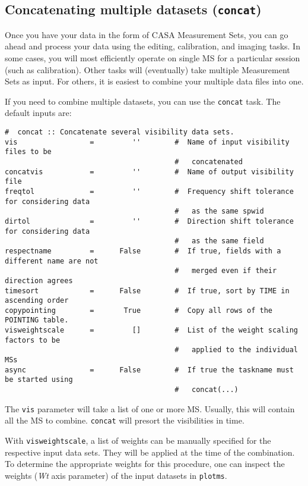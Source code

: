 \subsection{Concatenating multiple datasets ({\tt concat})}
\label{section:io.concat}

Once you have your data in the form of CASA Measurement Sets, you
can go ahead and process your data using the editing, calibration,
and imaging tasks.  In some cases, you will most efficiently operate
on single MS for a particular session (such as calibration).  Other
tasks will (eventually) take multiple Measurement Sets as input.  For others,
it is easiest to combine your multiple data files into one.

If you need to combine multiple datasets, you can use the {\tt concat} task.
The default inputs are:
\small
\begin{verbatim}
#  concat :: Concatenate several visibility data sets.
vis                 =         ''        #  Name of input visibility files to be
                                        #   concatenated
concatvis           =         ''        #  Name of output visibility file
freqtol             =         ''        #  Frequency shift tolerance for considering data
                                        #   as the same spwid
dirtol              =         ''        #  Direction shift tolerance for considering data
                                        #   as the same field
respectname         =      False        #  If true, fields with a different name are not
                                        #   merged even if their direction agrees
timesort            =      False        #  If true, sort by TIME in ascending order
copypointing        =       True        #  Copy all rows of the POINTING table.
visweightscale      =         []        #  List of the weight scaling factors to be
                                        #   applied to the individual MSs
async               =      False        #  If true the taskname must be started using
                                        #   concat(...)
\end{verbatim}
\normalsize

The {\tt vis} parameter will take a list of one or more MS.  Usually,
this will contain all the MS to combine. {\tt concat} will presort the
visibilities in time.

With {\tt visweightscale}, a list of weights can be manually specified
for the respective input data sets. They will be applied at the time
of the combination. To determine the appropriate weights for this
procedure, one can inspect the weights ({\it Wt} axis parameter) of
the input datasets in {\tt plotms}.

